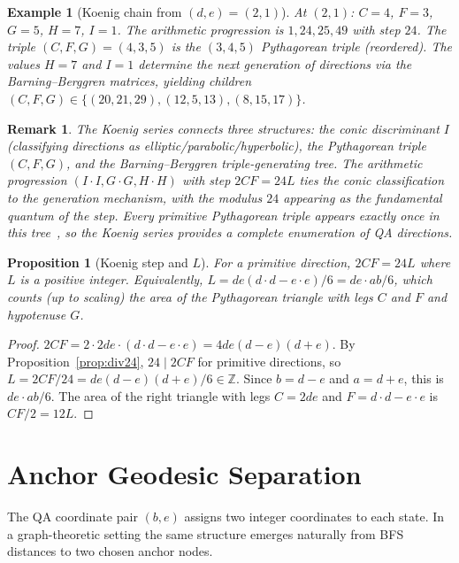 \documentclass[11pt]{article}
\newtheorem{proposition}[definition]{Proposition}
\newtheorem{remark}[definition]{Remark}
\newtheorem{example}[definition]{Example}
\begin{document}
\begin{example}[Koenig chain from $(d,e) = (2,1)$]
At $(2,1)$: $C=4$, $F=3$, $G=5$, $H=7$, $I=1$.  The arithmetic progression is $1, 24, 25, 49$ with step $24$.  The triple $(C,F,G) = (4,3,5)$ is the $(3,4,5)$ Pythagorean triple (reordered).  The values $H=7$ and $I=1$ determine the next generation of directions via the Barning--Berggren matrices, yielding children $(C,F,G) \in \{(20,21,29), (12,5,13), (8,15,17)\}$.
\end{example}

\begin{remark}
The Koenig series connects three structures: the conic discriminant $I$ (classifying directions as elliptic/parabolic/hyperbolic), the Pythagorean triple $(C,F,G)$, and the Barning--Berggren triple-generating tree.  The arithmetic progression $(I\cdot I, G\cdot G, H\cdot H)$ with step $2CF = 24L$ ties the conic classification to the generation mechanism, with the modulus $24$ appearing as the fundamental quantum of the step.  Every primitive Pythagorean triple appears exactly once in this tree~\cite{barning1963}, so the Koenig series provides a complete enumeration of QA directions.
\end{remark}

\begin{proposition}[Koenig step and $L$]
For a primitive direction, $2CF = 24L$ where $L$ is a positive integer.  Equivalently, $L = de(d\cdot d - e\cdot e)/6 = de \cdot ab / 6$, which counts (up to scaling) the area of the Pythagorean triangle with legs $C$ and $F$ and hypotenuse $G$.
\end{proposition}

\begin{proof}
$2CF = 2 \cdot 2de \cdot (d\cdot d - e\cdot e) = 4de(d-e)(d+e)$.  By Proposition~\ref{prop:div24}, $24 \mid 2CF$ for primitive directions, so $L = 2CF/24 = de(d-e)(d+e)/6 \in \mathbb{Z}$.  Since $b = d-e$ and $a = d+e$, this is $de\cdot ab/6$.  The area of the right triangle with legs $C=2de$ and $F=d\cdot d - e\cdot e$ is $CF/2 = 12L$.
\end{proof}

\section{Anchor Geodesic Separation}\label{sec:ags}

The QA coordinate pair $(b, e)$ assigns two integer coordinates to each state.
In a graph-theoretic setting the same structure emerges naturally from BFS distances
to two chosen anchor nodes.
\end{document}
